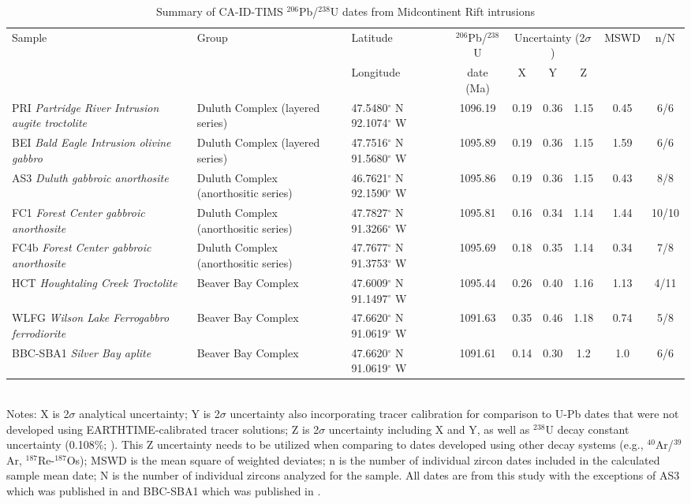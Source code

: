 \documentclass[11pt,letterpaper]{article}
\begin{document}
\begin{table}[h!]
\footnotesize
\caption{Summary of CA-ID-TIMS $^{206}$Pb/$^{238}$U dates from Midcontinent Rift intrusions}
\begin{tabular}{|p{3.2 cm}|p{2.4 cm}|p{1.8 cm}|c|ccc|c|c|}
\hline
Sample & Group & Latitude & $^{206}$Pb/$^{238}$U & \multicolumn{3}{|c|}{Uncertainty (2$\sigma$)} & MSWD & n/N \\
 &  & Longitude & date (Ma) & X & Y & Z & & \\
\hline
PRI \textit{Partridge River Intrusion augite troctolite} & Duluth Complex (layered series) & 47.5480$^{\circ}$ N 92.1074$^{\circ}$ W & 1096.19 & 0.19 & 0.36 & 1.15 & 0.45 & 6/6 \\
\hline
BEI \textit{Bald Eagle Intrusion olivine gabbro} & Duluth Complex (layered series) & 47.7516$^{\circ}$ N 91.5680$^{\circ}$ W & 1095.89 & 0.19 & 0.36 & 1.15 & 1.59 & 6/6 \\
\hline
AS3 \textit{Duluth gabbroic anorthosite} & Duluth Complex (anorthositic series) & 46.7621$^{\circ}$ N 92.1590$^{\circ}$ W & 1095.86 & 0.19 & 0.36 & 1.15 & 0.43 & 8/8 \\
\hline
FC1 \textit{Forest Center gabbroic anorthosite} & Duluth Complex (anorthositic series) & 47.7827$^{\circ}$ N 91.3266$^{\circ}$ W & 1095.81 & 0.16 & 0.34 & 1.14 & 1.44 & 10/10 \\
\hline
FC4b \textit{Forest Center gabbroic anorthosite} & Duluth Complex (anorthositic series) & 47.7677$^{\circ}$ N 91.3753$^{\circ}$ W & 1095.69 & 0.18 & 0.35 & 1.14 & 0.34 & 7/8 \\
\hline
HCT \textit{Houghtaling Creek Troctolite} & Beaver Bay Complex & 47.6009$^{\circ}$ N 91.1497$^{\circ}$ W & 1095.44 & 0.26 & 0.40 & 1.16 & 1.13 & 4/11  \\
\hline
WLFG \textit{Wilson Lake Ferrogabbro ferrodiorite} & Beaver Bay Complex & 47.6620$^{\circ}$ N 91.0619$^{\circ}$ W & 1091.63 & 0.35 & 0.46 & 1.18 & 0.74 & 5/8 \\
\hline
BBC-SBA1 \textit{Silver Bay aplite} & Beaver Bay Complex & 47.6620$^{\circ}$ N 91.0619$^{\circ}$ W & 1091.61 & 0.14 & 0.30 & 1.2 & 1.0 & 6/6 \\
\hline
\end{tabular}\\
Notes: X is 2$\sigma$ analytical uncertainty; Y is 2$\sigma$ uncertainty also incorporating tracer calibration for comparison to U-Pb dates that were not developed using EARTHTIME-calibrated tracer solutions; Z is 2$\sigma$ uncertainty including X and Y, as well as $^{238}$U decay constant uncertainty (0.108$\%$; \citealp{Jaffey1971a}). This Z uncertainty needs to be utilized when comparing to dates developed using other decay systems (e.g., $^{40}$Ar/$^{39}$Ar, $^{187}$Re-$^{187}$Os); MSWD is the mean square of weighted deviates; n is the number of individual zircon dates included in the calculated sample mean date; N is the number of individual zircons analyzed for the sample. All dates are from this study with the exceptions of AS3 which was published in \cite{Schoene2006a} and BBC-SBA1 which was published in \cite{Fairchild2017a}.

\end{table}
\end{document}
